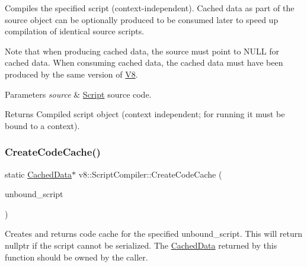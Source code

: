 Compiles the specified script (context-\/independent). Cached data as part of the source object can be optionally produced to be consumed later to speed up compilation of identical source scripts.

Note that when producing cached data, the source must point to N\+U\+LL for cached data. When consuming cached data, the cached data must have been produced by the same version of \mbox{\hyperlink{classv8_1_1V8}{V8}}.


\begin{DoxyParams}{Parameters}
{\em source} & \mbox{\hyperlink{classv8_1_1Script}{Script}} source code. \\
\hline
\end{DoxyParams}
\begin{DoxyReturn}{Returns}
Compiled script object (context independent; for running it must be bound to a context). 
\end{DoxyReturn}
\mbox{\label{classv8_1_1ScriptCompiler_a3083edf7f887a38f1024d11c0dd7ccdb}} 
\subsubsection{\texorpdfstring{Create\+Code\+Cache()}{CreateCodeCache()}\hspace{0.1cm}{\footnotesize\ttfamily [1/2]}}
{\footnotesize\ttfamily static \mbox{\hyperlink{structv8_1_1ScriptCompiler_1_1CachedData}{Cached\+Data}}$\ast$ v8\+::\+Script\+Compiler\+::\+Create\+Code\+Cache (\begin{DoxyParamCaption}\item[{\mbox{\hyperlink{classv8_1_1Local}{Local}}$<$ \mbox{\hyperlink{classv8_1_1UnboundScript}{Unbound\+Script}} $>$}]{unbound\+\_\+script }\end{DoxyParamCaption})\hspace{0.3cm}{\ttfamily [static]}}

Creates and returns code cache for the specified unbound\+\_\+script. This will return nullptr if the script cannot be serialized. The \mbox{\hyperlink{structv8_1_1ScriptCompiler_1_1CachedData}{Cached\+Data}} returned by this function should be owned by the caller. \mbox{\label{classv8_1_1ScriptCompiler_af62a9c3e10c17aec5a99f48bff05f23e}} 
